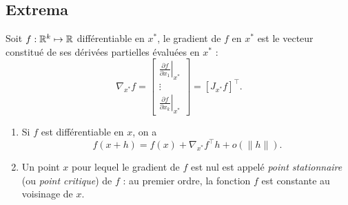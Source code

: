 \subsection{Extrema}

\begin{definition}[Gradient]
  Soit $f : \mathbb{R}^k \mapsto \mathbb{R}$ différentiable en $x^*$, le gradient de $f$ en $x^*$ est le vecteur constitué de ses dérivées partielles évaluées en $x^*$ : 
  $$
  \nabla_{x^*}f 
  = \left[\begin{array}{c}
              \displaystyle{\left.\frac{\partial f}{\partial x_1}\right|_{x^*}}  \\
              \vdots \\
              \displaystyle{\left.\frac{\partial f}{\partial x_k}\right|_{x^*}} 
             \end{array}\right]
  = \left[J_{x^*} f\right]^\top.
  $$
\end{definition}

\remark
\begin{enumerate}
  \item Si $f$ est différentiable en $x$, on a
  $$
  f(x + h) = f(x) + \nabla_{x^*}f^\top h + o(\|h\|).
  $$
  \item Un point $x$ pour lequel le gradient de $f$ est nul est appelé {\em point stationnaire} (ou {\em point critique}) de $f$ : au premier ordre, la fonction $f$ est constante au voisinage de $x$.
\end{enumerate}


